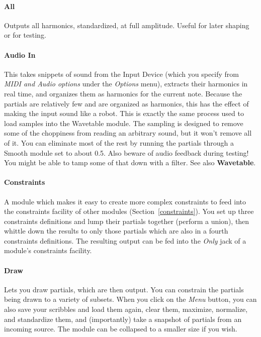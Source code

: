\documentclass{article}
\begin{document}
\paragraph{All}  Outputs all harmonics, standardized, at full amplitude.  Useful for later shaping or for testing.

\paragraph{Audio In}  This takes snippets of sound from the Input Device (which you specify from {\it MIDI and Audio options} under the {\it Options} menu), extracts their harmonics in real time, and organizes them as harmonics for the current note. Because the partials are relatively few and are organized as harmonics, this has the effect of making the input sound like a robot.  This is exactly the same process used to load samples into the Wavetable module.  The sampling is designed to remove some of the choppiness from reading an arbitrary sound, but it won't remove all of it.  You can eliminate most of the rest by running the partials through a Smooth module set to about 0.5.  Also beware of audio feedback during testing!  You might be able to tamp some of that down with a filter. See also {\bf Wavetable}.


\paragraph{Constraints}   A module which makes it easy to create more complex constraints to feed into the constraints facility of other modules (Section~\ref{constraints}). You set up three constraints definitions and lump their partials together (perform a union), then whittle down the results to only those partials which are also in a fourth constraints definitions.  The resulting output can be fed into the {\it Only} jack of a module's constraints facility.

\paragraph{Draw}   Lets you draw partials, which are then output.   You can constrain the partials being drawn to a variety of subsets.  When you click on the {\it Menu} button, you can also save your scribbles and load them again, clear them, maximize, normalize, and standardize them, and (importantly) take a snapshot of partials from an incoming source.  The module can be collapsed to a smaller size if you wish.
\end{document}

